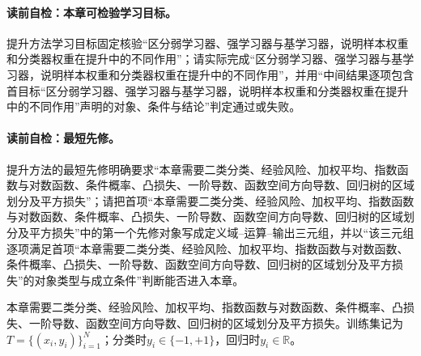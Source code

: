 \paragraph{读前自检：本章可检验学习目标。}提升方法学习目标固定核验“区分弱学习器、强学习器与基学习器，说明样本权重和分类器权重在提升中的不同作用”；请实际完成“区分弱学习器、强学习器与基学习器，说明样本权重和分类器权重在提升中的不同作用”，并用“中间结果逐项包含首目标“区分弱学习器、强学习器与基学习器，说明样本权重和分类器权重在提升中的不同作用”声明的对象、条件与结论”判定通过或失败。\par


\label{struct:V3-C03-CH02}
\paragraph{读前自检：最短先修。}提升方法的最短先修明确要求“本章需要二类分类、经验风险、加权平均、指数函数与对数函数、条件概率、凸损失、一阶导数、函数空间方向导数、回归树的区域划分及平方损失”；请把首项“本章需要二类分类、经验风险、加权平均、指数函数与对数函数、条件概率、凸损失、一阶导数、函数空间方向导数、回归树的区域划分及平方损失”中的第一个先修对象写成定义域--运算--输出三元组，并以“该三元组逐项满足首项“本章需要二类分类、经验风险、加权平均、指数函数与对数函数、条件概率、凸损失、一阶导数、函数空间方向导数、回归树的区域划分及平方损失”的对象类型与成立条件”判断能否进入本章。\par

\begin{prerequisitebox}
本章需要二类分类、经验风险、加权平均、指数函数与对数函数、条件概率、凸损失、一阶导数、函数空间方向导数、回归树的区域划分及平方损失。训练集记为$T=\{(x_i,y_i)\}_{i=1}^{N}$；分类时$y_i\in\{-1,+1\}$，回归时$y_i\in\mathbb R$。
\end{prerequisitebox}

